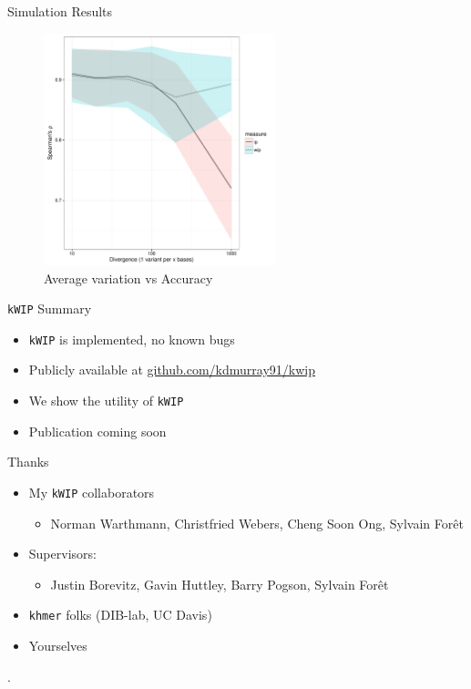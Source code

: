 \documentclass[t]{beamer}
\begin{document}
\begin{frame}{Simulation Results}
  \begin{figure}
    \centering
    \includegraphics[width=0.6\textwidth]{img/variation_vs_accuracy.pdf}
    \caption{Average variation vs Accuracy}
  \end{figure}
\end{frame}

\begin{frame}{\texttt{kWIP} Summary}
  \begin{itemize}
    \item \texttt{kWIP} is implemented, no known bugs
    \item Publicly available at \url{github.com/kdmurray91/kwip}
    \item We show the utility of \texttt{kWIP}
    \item Publication coming soon
  \end{itemize}
\end{frame}

\begin{frame}{Thanks}
  \begin{itemize}
    \item My \texttt{kWIP} collaborators
      \begin{itemize}
        \item Norman Warthmann, Christfried Webers, Cheng Soon Ong, Sylvain For\^{e}t
      \end{itemize}
    \item Supervisors:
      \begin{itemize}
        \item Justin Borevitz, Gavin Huttley, Barry Pogson, Sylvain For\^{e}t
      \end{itemize}
    \item \texttt{khmer} folks (DIB-lab, UC Davis)
    \item Yourselves
  \end{itemize}
\end{frame}

\begin{frame}[shrink=25]{}
  \printbibliography
  \vfill
  .
\end{frame}
\end{document}
